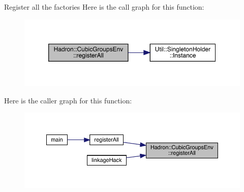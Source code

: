 Register all the factories Here is the call graph for this function\+:\nopagebreak
\begin{figure}[H]
\begin{center}
\leavevmode
\includegraphics[width=350pt]{d2/d0e/namespaceHadron_1_1CubicGroupsEnv_a72c88213059f1ce4ac24ef0b5032307b_cgraph}
\end{center}
\end{figure}
Here is the caller graph for this function\+:
\nopagebreak
\begin{figure}[H]
\begin{center}
\leavevmode
\includegraphics[width=350pt]{d2/d0e/namespaceHadron_1_1CubicGroupsEnv_a72c88213059f1ce4ac24ef0b5032307b_icgraph}
\end{center}
\end{figure}
